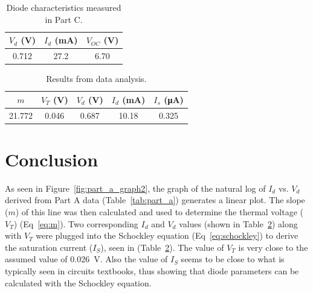 \documentclass{article}
\begin{document}
\begin{table}[hbtp]
  \centering
  \begin{tabular}{ccc}
    $V_d$ (\si{V}) & $I_d$ (\si{mA}) & $V_{OC}$ (\si{V}) \\
    \hline
    0.712 & 27.2 & 6.70 \\
  \end{tabular}
  \caption{\label{tab:part_c} Diode characteristics measured in Part C.}
\end{table}

\begin{table}[h!]
  \centering
  \begin{tabular}{ccccc}
    $m$ & $V_T$ (\si{V}) & $V_d$ (\si{V}) & $I_d$ (\si{mA}) & $I_s$ (\si{\micro\ampere}) \\
    \hline
    21.772 & 0.046 & 0.687 & 10.18 & 0.325 \\
  \end{tabular}
  \caption{\label{tab:analysis} Results from data analysis.}
\end{table}

\section{Conclusion}
\label{sec:conclusion}

As seen in Figure~\ref{fig:part_a_graph2}, the graph of the natural
log of $I_d$ vs. $V_d$ derived from Part A data
(Table~\ref{tab:part_a}) generates a linear plot.  The slope ($m$) of
this line was then calculated and used to determine the thermal
voltage ($V_T$) (Eq~\ref{eq:m}).  Two corresponding $I_d$ and $V_d$
values (shown in Table~\ref{tab:analysis}) along with $V_T$ were
plugged into the Schockley equation (Eq~\ref{eq:schockley}) to derive
the saturation current ($I_S$), seen in (Table~\ref{tab:analysis}).
The value of $V_T$ is very close to the assumed value of
\SI{0.026}{V}.  Also the value of $I_S$ seems to be close to what is
typically seen in circuits textbooks, thus showing that diode
parameters can be calculated with the Schockley equation.

\end{document}

